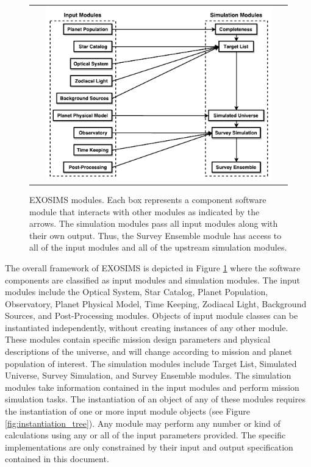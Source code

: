 \documentclass[cleanfoot]{asme2ej}
\newcommand{\reffig}[1]{Figure \ref{#1}}
\begin{document}
\begin{figure}[ht]
    \begin{center}
        \begin{tabular}{c}
             \includegraphics[width=0.9\textwidth]{codeflow5}
        \end{tabular}
    \end{center}
    \caption{EXOSIMS modules. Each box represents a component software module that interacts with other modules as indicated by the arrows. The simulation modules pass all input modules along with their own output.  Thus, the Survey Ensemble module has access to all of the input modules and all of the upstream simulation modules.}
    \label{figure_framework}
\end{figure}

The overall framework of EXOSIMS is depicted in \reffig{figure_framework} where the software components are classified as input modules and simulation modules.  The input modules include the Optical System, Star Catalog, Planet Population, Observatory, Planet Physical Model, Time Keeping, Zodiacal Light, Background Sources, and Post-Processing modules.  Objects of input module classes can be instantiated independently, without creating instances of any other module.  These modules contain specific mission design parameters and physical descriptions of the universe, and will change according to mission and planet population of interest.  The simulation modules include Target List, Simulated Universe, Survey Simulation, and Survey Ensemble modules.  The simulation modules take information contained in the input modules and perform mission simulation tasks. The instantiation of an object of any of these modules requires the instantiation of one or more input module objects (see \reffig{fig:instantiation_tree}).  Any module may perform any number or kind of calculations using any or all of the input parameters provided.  The specific implementations are only constrained by their input and output specification contained in this document.
\end{document}
